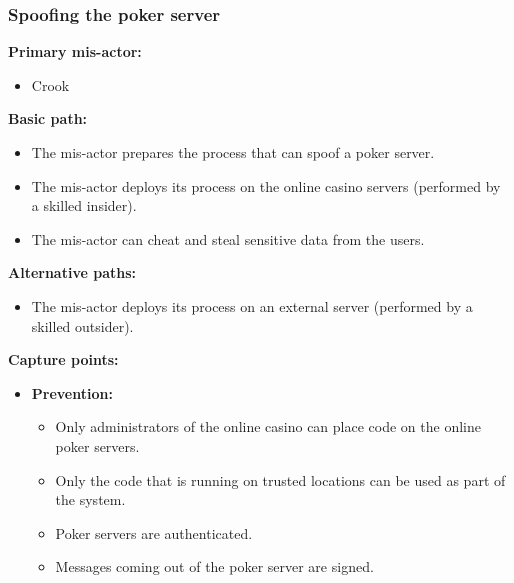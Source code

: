 \documentclass[a4paper,11pt]{report}
\begin{document}
\subsubsection{Spoofing the poker server}
\textbf{Primary mis-actor:}
\begin{itemize}
\item Crook
\end{itemize}
\textbf{Basic path:}
\begin{itemize}
\item The mis-actor prepares the process that can spoof a poker server.
\item The mis-actor deploys its process on the online casino servers (performed by a skilled insider).
\item The mis-actor can cheat and steal sensitive data from the users.
\end{itemize}
\textbf{Alternative paths:}
\begin{itemize}
\item The mis-actor deploys its process on an external server (performed by a skilled outsider).
\end{itemize}
\textbf{Capture points:}
\begin{itemize}
\item \textbf{Prevention:}
\begin{itemize}
\item Only administrators of the online casino can place code on the online poker servers.
\item Only the code that is running on trusted locations can be used as part of the system.
\item Poker servers are authenticated.
\item Messages coming out of the poker server are signed.
\end{itemize}
\end{itemize}
\end{document}
